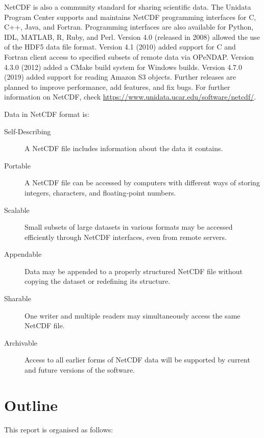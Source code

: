 NetCDF is also a community standard for sharing scientific data.
The Unidata Program Center supports and maintains NetCDF programming interfaces for C, C++, Java, and Fortran.
Programming interfaces are also available for Python, IDL, MATLAB, R, Ruby, and Perl.
Version 4.0 (released in 2008) allowed the use of the HDF5 data file format.
Version 4.1 (2010) added support for C and Fortran client access to specified subsets of remote data via OPeNDAP.
Version 4.3.0 (2012) added a CMake build system for Windows builds.
Version 4.7.0 (2019) added support for reading Amazon S3 objects. Further releases are planned to improve performance, add features, and fix bugs.
For further information on NetCDF, check \url{https://www.unidata.ucar.edu/software/netcdf/}.

Data in NetCDF format is:

\begin{description}

\item[Self-Describing] A NetCDF file includes information about the data it contains.

\item[Portable] A NetCDF file can be accessed by computers with different ways of storing integers, characters, and floating-point numbers.

\item[Scalable] Small subsets of large datasets in various formats may be accessed efficiently through NetCDF interfaces, even from remote servers.

\item[Appendable] Data may be appended to a properly structured NetCDF file without copying the dataset or redefining its structure.

\item[Sharable] One writer and multiple readers may simultaneously access the same NetCDF file.

\item[Archivable] Access to all earlier forms of NetCDF data will be supported by current and future versions of the software.

\end{description}

\section{Outline}

This report is organised as follows:

